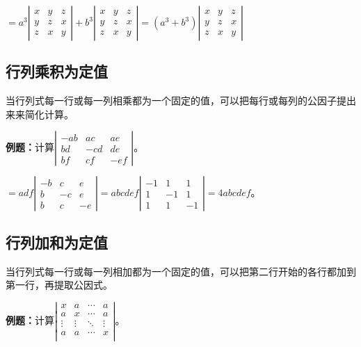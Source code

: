 \documentclass[UTF8, 12pt]{ctexart}
\begin{document}
$=a^3\left|\begin{array}{ccc}
    x & y & z \\
    y & z & x \\
    z & x & y
\end{array}\right|+b^3\left|\begin{array}{ccc}
    x & y & z \\
    y & z & x \\
    z & x & y
\end{array}\right|=(a^3+b^3)\left|\begin{array}{ccc}
    x & y & z \\
    y & z & x \\
    z & x & y
\end{array}\right|
$

\subsection{行列乘积为定值}

当行列式每一行或每一列相乘都为一个固定的值，可以把每行或每列的公因子提出来来简化计算。

\textbf{例题：}计算$\left|\begin{array}{ccc} 
    -ab & ac & ae \\
    bd & -cd & de \\
    bf & cf & -ef
\end{array}\right|$。

$=adf\left|\begin{array}{ccc} 
    -b & c & e \\
    b & -c & e \\
    b & c & -e
\end{array}\right|
=abcdef\left|\begin{array}{ccc} 
    -1 & 1 & 1 \\
    1 & -1 & 1 \\
    1 & 1 & -1
\end{array}\right|=4abcdef$。

\subsection{行列加和为定值}

当行列式每一行或每一列相加都为一个固定的值，可以把第二行开始的各行都加到第一行，再提取公因式。

\textbf{例题：}计算$\left|\begin{array}{cccc} 
    x & a & \cdots & a \\
    a & x & \cdots & a \\
    \vdots & \vdots & \ddots & \vdots \\
    a & a & \cdots & x \\
\end{array}\right|$。
\end{document}

